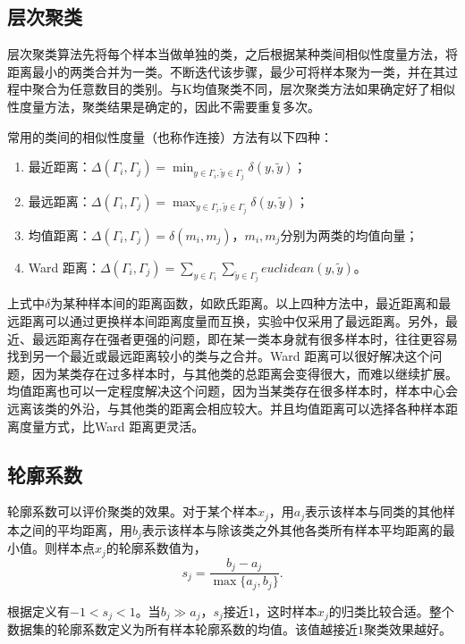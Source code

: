 \subsection{层次聚类}
层次聚类算法先将每个样本当做单独的类，之后根据某种类间相似性度量方法，将距离最小的两类合并为一类。不断迭代该步骤，最少可将样本聚为一类，并在其过程中聚合为任意数目的类别。与K均值聚类不同，层次聚类方法如果确定好了相似性度量方法，聚类结果是确定的，因此不需要重复多次。

常用的类间的相似性度量（也称作连接）方法有以下四种：
\begin{enumerate}
\item 最近距离：$\Delta(\Gamma_i,\Gamma_j)=\min_{y\in \Gamma_i, \tilde{y}\in \Gamma_j}\delta(y,\tilde{y})$；
\item 最远距离：$\Delta(\Gamma_i,\Gamma_j)=\max_{y\in \Gamma_i, \tilde{y}\in \Gamma_j}\delta(y,\tilde{y})$；
\item 均值距离：$\Delta(\Gamma_i,\Gamma_j)=\delta(m_i,m_j)$，$m_i,m_j$分别为两类的均值向量；
\item {\ttfamily Ward} 距离：$\Delta(\Gamma_i,\Gamma_j)=\sum_{y\in \Gamma_i}\sum_{\tilde{y}\in \Gamma_j}euclidean(y,\tilde{y})$。
\end{enumerate}
上式中$\delta$为某种样本间的距离函数，如欧氏距离。以上四种方法中，最近距离和最远距离可以通过更换样本间距离度量而互换，实验中仅采用了最远距离。另外，最近、最远距离存在强者更强的问题，即在某一类本身就有很多样本时，往往更容易找到另一个最近或最远距离较小的类与之合并。{\ttfamily Ward} 距离可以很好解决这个问题，因为某类存在过多样本时，与其他类的总距离会变得很大，而难以继续扩展。均值距离也可以一定程度解决这个问题，因为当某类存在很多样本时，样本中心会远离该类的外沿，与其他类的距离会相应较大。并且均值距离可以选择各种样本距离度量方式，比{\ttfamily Ward} 距离更灵活。

\subsection{轮廓系数}
轮廓系数可以评价聚类的效果。对于某个样本$x_j$，用$a_j$表示该样本与同类的其他样本之间的平均距离，用$b_j$表示该样本与除该类之外其他各类所有样本平均距离的最小值。则样本点$x_j$的轮廓系数值为，
\begin{equation}
s_j=\frac{b_j-a_j}{\max\{a_j, b_j\}}.
\end{equation}

根据定义有$-1<s_j<1$。当$b_j\gg a_j$，$s_j$接近$1$，这时样本$x_j$的归类比较合适。整个数据集的轮廓系数定义为所有样本轮廓系数的均值。该值越接近$1$聚类效果越好。

